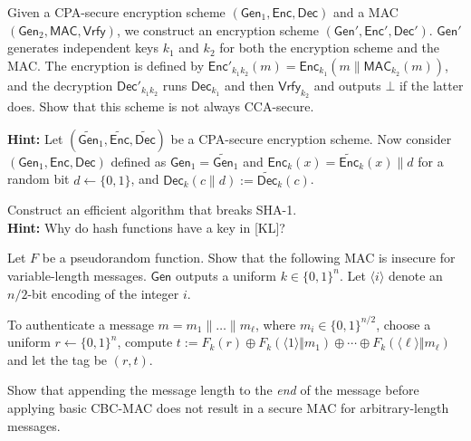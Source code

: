 \documentclass[a4paper,10pt,landscape,twocolumn]{scrartcl}
\begin{document}
\begin{exercise}

Given a CPA-secure encryption scheme $(\mathsf{Gen}_1, \mathsf{Enc}, \mathsf{Dec})$ and a MAC $(\mathsf{Gen}_2, \mathsf{MAC}, \mathsf{Vrfy})$, we construct an encryption scheme $(\mathsf{Gen}', \mathsf{Enc}', \mathsf{Dec}')$. $\mathsf{Gen}'$ generates independent keys $k_1$ and $k_2$ for both the encryption scheme and the MAC. The encryption is defined by $\mathsf{Enc}'_{k_1k_2}(m)=\mathsf{Enc}_{k_1}(m\|\mathsf{MAC}_{k_2}(m))$, and the decryption $\mathsf{Dec}'_{k_1k_2}$ runs $\mathsf{Dec}_{k_1}$ and then $\mathsf{Vrfy}_{k_2}$ and outputs $\bot$ if the latter does. Show that this scheme is not always CCA-secure.

\textbf{Hint:} Let $(\mathsf{\widetilde{Gen}}_1, \mathsf{\widetilde{Enc}}, \mathsf{\widetilde{Dec}})$ be a CPA-secure encryption scheme. Now consider $(\mathsf{Gen}_1, \mathsf{Enc}, \mathsf{Dec})$ defined as 
$\mathsf{Gen}_1 = \mathsf{\widetilde{Gen}}_1$ and $\mathsf{Enc}_k(x) =  \mathsf{\widetilde{Enc}}_k(x) \| d$ for a random bit $d \leftarrow \{0,1\}$, and $\mathsf{Dec}_k(c \| d) := \mathsf{\widetilde{Dec}}_k(c)$.

\end{exercise}

\pagebreak

\begin{bonusexercise}[SHA-1]
	Construct an efficient algorithm that breaks SHA-1.\\
	\textbf{Hint:} Why do hash functions have a key in [KL]?
\end{bonusexercise}



\begin{bonusexercise}

Let $F$ be a pseudorandom function. Show that the following MAC is insecure for variable-length messages. $\mathsf{Gen}$ outputs a uniform $k\in\{0,1\}^n$. Let $\langle i\rangle$ denote an $n/2$-bit encoding of the integer $i$.

To authenticate a message $m=m_1\|\dots\| m_{\ell}$, where $m_i\in\{0,1\}^{n/2}$, choose a uniform $r\gets\{0,1\}^n$, compute $t:=F_k(r)\oplus F_k(\langle 1\rangle\Vert m_1)\oplus\cdots\oplus F_k(\langle \ell\rangle\Vert m_{\ell})$ and let the tag be $( r,t)$.

\end{bonusexercise}

\begin{bonusexercise}
Show that appending the message length to the \emph{end} of the message before applying basic CBC-MAC does not result in a secure MAC for arbitrary-length messages.
\end{bonusexercise}
\end{document}
